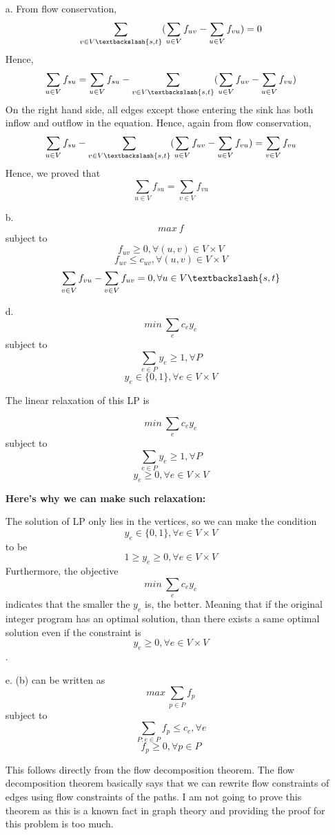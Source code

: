 \documentclass[11pt]{article}
\theoremstyle{remark}
\begin{document}
\color{blue}
\begin{itemize}
\item[a.] From flow conservation, 
$$\sum_{v\in V \textbackslash \{s,t\}} (\sum_{u \in V} f_{uv} - \sum_{u \in V} f_{vu}) = 0$$
Hence, $$\sum_{u \in V} f_{su} = \sum_{u \in V}f_{su} - \sum_{v\in V \textbackslash \{s,t\}} (\sum_{u \in V} f_{uv} - \sum_{u \in V} f_{vu})$$
On the right hand side, all edges except those entering the sink has both inflow and outflow in the equation. Hence, again from flow conservation,
$$ \sum_{u \in V}f_{su} - \sum_{v\in V \textbackslash \{s,t\}} (\sum_{u \in V} f_{uv} - \sum_{u \in V} f_{vu}) = \sum_{v \in V} f_{vu}$$
Hence, we proved that 
$$\sum_{u \in V} f_{su}= \sum_{v \in V} f_{vu}$$

\item[b.] 
$$max \ f$$
subject to 
$$f_{uv}\geq 0, \forall (u,v) \in V\times V$$
$$f_{uv} \leq c_{uv}, \forall (u,v) \in V\times V$$
$$\sum_{v\in V} f_{vu} -\sum_{v\in V} f_{uv} = 0, \forall u \in  V \textbackslash \{s,t\}$$

\item[d.]
$$min \ \sum_e c_e y_e$$
subject to 
$$\sum_{e\in P} y_e \geq 1, \forall P$$
$$y_e \in \{0,1\}, \forall e \in V\times V$$

The linear relaxation of this LP is

$$min \ \sum_e c_e y_e$$
subject to 
$$\sum_{e\in P} y_e \geq 1, \forall P$$
$$y_e \geq 0, \forall e \in V\times V$$

\textbf{Here's why we can make such relaxation:}

The solution of LP only lies in the vertices, so we can make the condition 
$$y_e \in \{0,1\}, \forall e \in V\times V$$
to be 
$$1 \geq y_e \geq 0, \forall e \in V\times V$$
Furthermore, the objective
$$min \ \sum_e c_e y_e$$
indicates that the smaller the $y_e$ is, the better. Meaning that if the original integer program has an optimal solution, than there exists a same optimal solution even if the constraint is 
$$y_e \geq 0, \forall e \in V\times V$$.

\item[e.]
(b) can be written as 
$$max \ \sum_{p\in P} f_p$$
subject to
$$\sum_{P:e\in P} f_p \leq c_e, \forall e$$
$$f_p \geq 0, \forall p \in P$$

This follows directly from the flow decomposition theorem. The flow decomposition theorem basically says that we can rewrite flow constraints of edges using flow constraints of the paths. I am not going to prove this theorem as this is a known fact in graph theory and providing the proof for this problem is too much.


\end{itemize}
\end{document}
